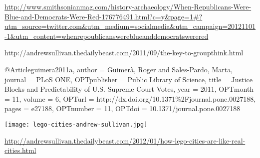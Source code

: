 
\url{http://www.smithsonianmag.com/history-archaeology/When-Republicans-Were-Blue-and-Democrats-Were-Red-176776491.html?c=y\&page=1#?utm\_source=twitter.com\&utm\_medium=socialmedia\&utm\_campaign=20121101-1\&utm\_content=whenrepoublicanswereblueanddemocratswerered}



http://andrewsullivan.thedailybeast.com/2011/09/the-key-to-groupthink.html

@Article{guimera2011a,
  author =       {Guimer\`{a}, Roger and Sales-Pardo, Marta},
  journal =      {PLoS ONE},
  OPTpublisher = {Public Library of Science},
  title =        {Justice Blocks and Predictability of U.S. Supreme
                  Court Votes},
  year =         {2011},
  OPTmonth =     {11},
  volume =       {6},
  OPTurl =       {http://dx.doi.org/10.1371\%2Fjournal.pone.0027188},
  pages =        {e27188},
  OPTnumber =    {11},
  OPTdoi =       {10.1371/journal.pone.0027188}
}        








\begin{frame}
  \texttt{[image: lego-cities-andrew-sullivan.jpg]}

\url{http://andrewsullivan.thedailybeast.com/2012/01/how-lego-cities-are-like-real-cities.html}

\end{frame}